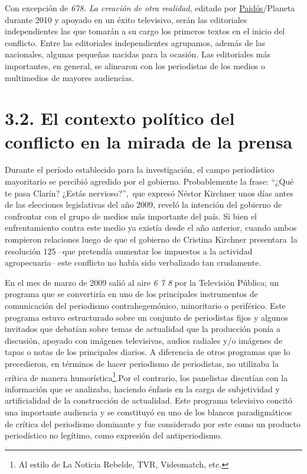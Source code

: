 Con excepción de \emph{678. La creación de otra realidad}, editado por \href{http://www.lecturalia.com/editoriales/79/paidos}{Paidós}/Planeta durante 2010 y apoyado en un éxito televisivo, serán las editoriales independientes las que tomarán a su cargo los primeros textos en el inicio del conflicto. Entre las editoriales independientes agrupamos, además de las nacionales, algunas pequeñas nacidas para la ocasión. Las editoriales más importantes, en general, se alinearon con los periodistas de los medios o multimedios de mayores audiencias.

\section{3.2. El contexto político del conflicto en la mirada de la prensa}

Durante el período establecido para la investigación, el campo periodístico mayoritario se percibió agredido por el gobierno. Probablemente la frase: \enquote{¿Qué te pasa Clarín? ¿Estás nervioso?},~que expresó Néstor Kirchner unos días antes de las elecciones legislativas del año 2009, reveló la intención del gobierno de confrontar con el grupo de medios más importante del país. Si bien el enfrentamiento contra este medio ya existía desde el año anterior, cuando ambos rompieron relaciones luego de que el gobierno de Cristina Kirchner presentara~la resolución 125 --que pretendía aumentar los impuestos a la actividad agropecuaria-- este conflicto no había sido verbalizado tan crudamente.

En el mes de marzo de 2009 salió al aire \emph{6 7 8} por la Televisión Pública; un programa que se convertiría en uno de los principales instrumentos de comunicación del periodismo contrahegemónico, minoritario o periférico. Este programa estuvo estructurado sobre un conjunto de periodistas fijos y algunos invitados que debatían sobre temas de actualidad que la producción ponía a discusión, apoyado con imágenes televisivas, audios radiales y/o imágenes de tapas o notas de los principales diarios. A diferencia de otros programas que lo precedieron, en términos de hacer periodismo de periodistas, no utilizaba la crítica de manera humorística\footnote{Al estilo de La Noticia Rebelde, TVR, Videomatch, etc.}.Por el contrario, los panelistas discutían con la información que se analizaba, haciendo énfasis en la carga de subjetividad y artificialidad de la construcción de actualidad. Este programa televisivo concitó una importante audiencia y se constituyó en uno de los blancos paradigmáticos de crítica del periodismo dominante y fue considerado por este como un producto periodístico no legítimo, como expresión del antiperiodismo.

